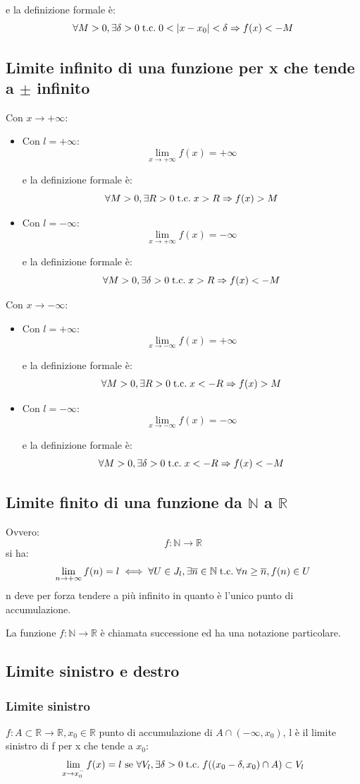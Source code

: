 \documentclass[a4paper, 12pt, openany]{book}
\begin{document}
	 e la definizione formale è:
	 \[\forall M > 0, \exists \delta > 0 \;\text{t.c.}\; 0 < |x - x_0| < \delta \Rightarrow f(x) < -M\]
	 \subsection{Limite infinito di una funzione per x che tende a $\pm$ infinito}
	 Con $x \rightarrow +\infty$:
	 \begin{itemize}
	 	\item Con $l = +\infty$:
	 \[\lim_{x \rightarrow + \infty} f(x) = + \infty\]
	 
	 e la definizione formale è:
	 \[\forall M > 0, \exists R > 0 \;\text{t.c.}\; x > R \Rightarrow f(x) > M\]
	 \item Con $l = -\infty$:
	 \[\lim_{x \rightarrow + \infty} f(x) = - \infty\]
	 
	 e la definizione formale è:
	 \[\forall M > 0, \exists \delta > 0 \;\text{t.c.}\; x > R \Rightarrow f(x) < -M\]
	 \end{itemize}
	 Con $x \rightarrow -\infty$:
	 \begin{itemize}
	 	\item Con $l = +\infty$:
	 	\[\lim_{x \rightarrow - \infty} f(x) = + \infty\]
	 	
	 	e la definizione formale è:
	 	\[\forall M > 0, \exists R > 0 \;\text{t.c.}\; x < -R \Rightarrow f(x) > M\]
	 	\item Con $l = -\infty$:
	 	\[\lim_{x \rightarrow - \infty} f(x) = - \infty\]
	 	
	 	e la definizione formale è:
	 	\[\forall M > 0, \exists \delta > 0 \;\text{t.c.}\; x < -R \Rightarrow f(x) < -M\]
	 \end{itemize}
	 \subsection{Limite finito di una funzione da $\mathbb{N}$ a $\mathbb{R}$}
	 Ovvero:
	 \[f: \mathbb{N} \rightarrow \mathbb{R}\]
	 si ha:
	 \[\lim_{n \rightarrow +\infty} f(n) = l \iff \forall U \in J_l, \exists \overline{n} \in \mathbb{N} \;\text{t.c.}\; \forall n \geq \overline{n}, f(n) \in U\]
	 n deve per forza tendere a più infinito in quanto è l'unico punto di accumulazione.
	 
	 La funzione $f: \mathbb{N} \rightarrow \mathbb{R}$ è chiamata successione ed ha una notazione particolare.
	 \subsection{Limite sinistro e destro}
	 \subsubsection{Limite sinistro}
	 $f: A \subset \mathbb{R} \longrightarrow \mathbb{R}, x_0 \in \mathbb{R}$ punto di accumulazione di $ A \cap(-\infty, x_0)$, l è il limite sinistro di f per x che tende a $x_0$:
	 \[\lim_{x \rightarrow x_0^-} f(x) = l \text{ se } \forall V_l, \exists \delta > 0 \;\text{t.c.}\; f((x_0 - \delta, x_0) \cap A) \subset V_l\]
\end{document}
